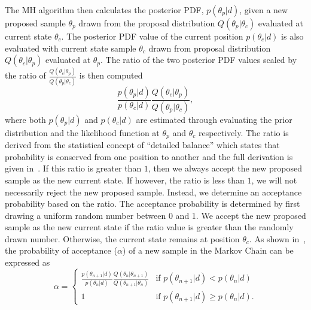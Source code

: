 The \ac{MH} algorithm then calculates the posterior \ac{PDF}, $p(\theta_{p}|d)$, given a new proposed sample $\theta_{p}$ drawn from the proposal distribution 
$Q(\theta_{p}|\theta_{c})$ evaluated at current state $\theta_{c}$. 
The posterior \ac{PDF} value of the current position 
$p(\theta_{c}|d)$ is also evaluated with current state sample $\theta_c$ 
drawn from proposal distribution $Q(\theta_{c}|\theta_{p})$ evaluated 
at $\theta_{p}$. 
The ratio of the two posterior \ac{PDF} values scaled by the ratio 
of $\frac{Q(\theta_{c}|\theta_{p})}{Q(\theta_{p}|\theta_{c})}$ is 
then computed
%
\begin{equation}
    \frac{p(\theta_{p}|d)}{p(\theta_{c}|d)} 
    \frac{Q(\theta_{c}|\theta_{p})}{Q(\theta_{p}|\theta_{c})},
\end{equation}
%
where both $p(\theta_{p}|d)$ and $p(\theta_{c}|d)$ are estimated through 
evaluating the prior distribution and the likelihood function at $\theta_{p}$ and $\theta_{c}$ respectively. The ratio is derived from the statistical 
concept of ``detailed balance'' which states that probability is 
conserved from one position to another and the full derivation is given 
in~\cite{2019arXiv190912313S}. If this ratio is greater than $1$, 
then we always 
accept the new proposed sample as the new current state. If however, 
the ratio is less 
than $1$, we will 
not necessarily reject the new proposed sample. Instead, we 
determine an acceptance probability based on the ratio. The acceptance 
probability is determined by first drawing a uniform random number between 
0 and 1. We accept the new proposed sample as the new current state if 
the ratio value is greater than the randomly drawn number. Otherwise, 
the current state remains at position $\theta_c$. As 
shown in~\cite{2019arXiv190912313S}, 
the probability of acceptance ($\alpha$) of a new sample 
in the Markov Chain can be expressed as
%
\begin{equation} \label{eq:MCMC_acceptance}
    \alpha = \begin{cases}
  \frac{p(\theta_{n+1}|d)}{p(\theta_{n}|d)} \frac{Q(\theta_{n}|\theta_{n+1})}{Q(\theta_{n+1}|\theta_{n})} & \text{if } p(\theta_{n+1}|d) < p(\theta_{n}|d)\\    
  1 & \text{if } p(\theta_{n+1}|d) \ge p(\theta_{n}|d).       
  \end{cases}
\end{equation}
%


